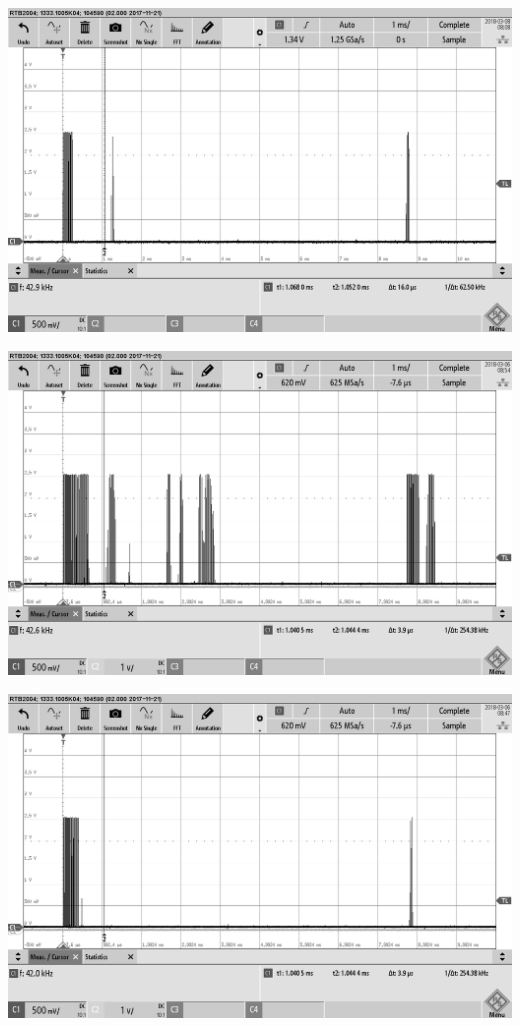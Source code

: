 \begin{minipage}{0.5\textwidth}
\includegraphics[width=1\textwidth%
]{Abbildungen/MessungenP1/EKULIT1,5m.png}
\label{fig:EKULIT1,5m}
\end{minipage}
\begin{minipage}{0.5\textwidth}
\includegraphics[width=1\textwidth%
]{Abbildungen/MessungenP1/MURATAr1,5m.png}
\label{fig:MURATA reciver 1,5m}
\end{minipage}
\begin{minipage}{0.5\textwidth}
\includegraphics[width=1\textwidth%
]{Abbildungen/MessungenP1/MURATAs1,5m.png}
\label{fig:MURATA sender 1,5m}
\end{minipage}
